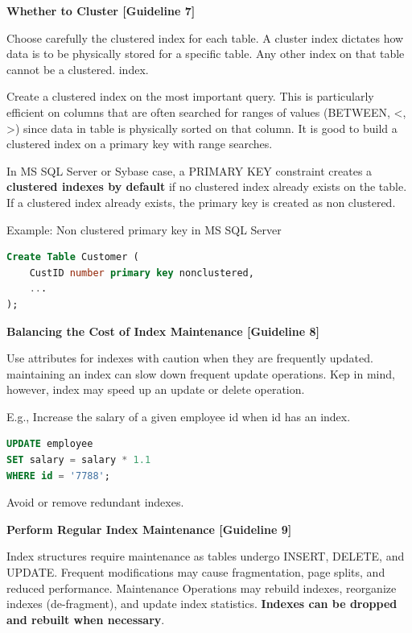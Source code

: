 \documentclass[11pt]{article}
\newcommand{\vs}[]{
    \vspace{11pt}
}
\newcommand{\boldsec}[1]{
    \vspace{11pt}
    \textbf{#1}
    \vspace{11pt}
}
\begin{document}
\boldsec{Whether to Cluster [Guideline 7]}

Choose carefully the clustered index for each table. A cluster index dictates how data is to be physically stored for a specific table. Any other index on that table cannot be a clustered. index.

Create a clustered index on the most important query. This is particularly efficient on columns that are often searched for ranges of values (BETWEEN, <, >) since data in table is physically sorted on that column. It is good to build a clustered index on a primary key with range searches.

In MS SQL Server or Sybase case, a PRIMARY KEY constraint creates a \textbf{clustered indexes by default} if no clustered index already exists on the table. If a clustered index already exists, the primary key is created as non clustered. 

Example: Non clustered primary key in MS SQL Server

\vs
\begin{lstlisting}[language=sql, breaklines=true, showstringspaces=false]
Create Table Customer (
    CustID number primary key nonclustered,
    ...
);
\end{lstlisting}
\vs

\boldsec{Balancing the Cost of Index Maintenance [Guideline 8]}

Use attributes for indexes with caution when they are frequently updated. maintaining an index can slow down frequent update operations. Kep in mind, however, index may speed up an update or delete operation.

E.g., Increase the salary of a given employee id when id has an index.

\vs
\begin{lstlisting}[language=sql, breaklines=true, showstringspaces=false]
UPDATE employee
SET salary = salary * 1.1
WHERE id = '7788';
\end{lstlisting}
\vs

Avoid or remove redundant indexes.

\boldsec{Perform Regular Index Maintenance [Guideline 9]}

Index structures require maintenance as tables undergo INSERT, DELETE, and UPDATE. Frequent modifications may cause fragmentation, page splits, and reduced performance. Maintenance Operations may rebuild indexes, reorganize indexes (de-fragment), and update index statistics. \textbf{Indexes can be dropped and rebuilt when necessary}.
\end{document}
